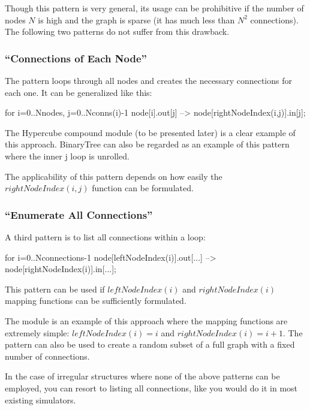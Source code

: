 Though this pattern is very general, its usage can be prohibitive if
the number of nodes $N$ is high and the graph is sparse (it has
much less than $N^2$ connections). The following
two patterns do not suffer from this drawback.


\subsubsection{``Connections of Each Node''}

The pattern loops through all nodes and creates the necessary
connections for each one. It can be generalized like this:

\begin{ned}
for i=0..Nnodes, j=0..Nconns(i)-1 {
    node[i].out[j] --> node[rightNodeIndex(i,j)].in[j];
}
\end{ned}

The Hypercube compound module (to be
presented later) is a clear example of this approach. BinaryTree can
also be regarded as an example of this pattern where the inner j loop
is unrolled.

The applicability of this pattern depends on how easily the $rightNodeIndex(i,j)$
function can be formulated.


\subsubsection{``Enumerate All Connections''}


A third pattern is to list all connections within a loop:

\begin{ned}
for i=0..Nconnections-1 {
    node[leftNodeIndex(i)].out[...] --> node[rightNodeIndex(i)].in[...];
}
\end{ned}

This pattern can be used if $leftNodeIndex(i)$ and $rightNodeIndex(i)$
mapping functions can be sufficiently formulated.

The  module is an example of this approach where the mapping
functions are extremely simple: $leftNodeIndex(i)=i$ and $rightNodeIndex(i) = i+1$.
The pattern can also be used to create a random subset of a full
graph with a fixed number of connections.

In the case of irregular structures where none of the above patterns
can be employed, you can resort to listing all connections, like you
would do it in most existing simulators.



